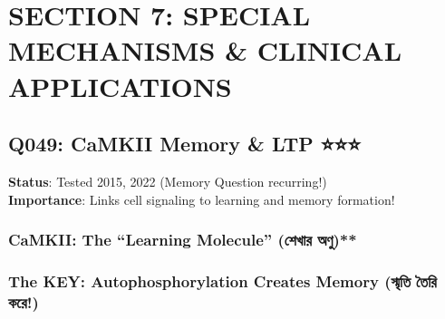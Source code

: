 \hypertarget{section-7-special-mechanisms-clinical-applications}{%
\chapter{SECTION 7: SPECIAL MECHANISMS \& CLINICAL
APPLICATIONS}\label{section-7-special-mechanisms-clinical-applications}}

\hypertarget{q049-camkii-memory-ltp}{%
\section{Q049: CaMKII Memory \& LTP
⭐⭐⭐}\label{q049-camkii-memory-ltp}}

\textbf{Status}: Tested 2015, 2022 (Memory Question recurring!)\\
\textbf{Importance}: Links cell signaling to learning and memory
formation!

\hypertarget{camkii-the-learning-molecule-ux9b6ux996ux9b0-ux985ux9a3}{%
\subsection{\texorpdfstring{\textbf{CaMKII: The ``Learning Molecule''}
(শেখার
অণু)**}{CaMKII: The ``Learning Molecule'' (শেখার অণু)**}}\label{camkii-the-learning-molecule-ux9b6ux996ux9b0-ux985ux9a3}}

\begin{Shaded}
\begin{Highlighting}[]
\end{Highlighting}
\end{Shaded}

\hypertarget{the-key-autophosphorylation-creates-memory-ux9b8ux9aeux9a4-ux9a4ux9b0-ux995ux9b0}{%
\subsection{\texorpdfstring{\textbf{The KEY: Autophosphorylation Creates
Memory} (স্মৃতি তৈরি
করে!)}{The KEY: Autophosphorylation Creates Memory (স্মৃতি তৈরি করে!)}}\label{the-key-autophosphorylation-creates-memory-ux9b8ux9aeux9a4-ux9a4ux9b0-ux995ux9b0}}

